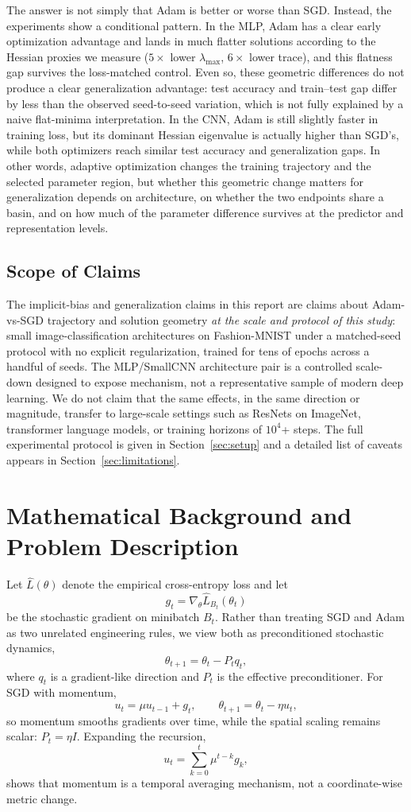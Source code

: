 \documentclass[11pt]{article}
\begin{document}
The answer is not simply that Adam is better or worse than SGD. Instead, the experiments show a conditional pattern. In the MLP, Adam has a clear early optimization advantage and lands in much flatter solutions according to the Hessian proxies we measure ($5\times$ lower $\lambda_{\max}$, $6\times$ lower trace), and this flatness gap survives the loss-matched control. Even so, these geometric differences do not produce a clear generalization advantage: test accuracy and train--test gap differ by less than the observed seed-to-seed variation, which is not fully explained by a naive flat-minima interpretation. In the CNN, Adam is still slightly faster in training loss, but its dominant Hessian eigenvalue is actually higher than SGD's, while both optimizers reach similar test accuracy and generalization gaps. In other words, adaptive optimization changes the training trajectory and the selected parameter region, but whether this geometric change matters for generalization depends on architecture, on whether the two endpoints share a basin, and on how much of the parameter difference survives at the predictor and representation levels.

\subsection{Scope of Claims}

The implicit-bias and generalization claims in this report are claims about Adam-vs-SGD trajectory and solution geometry \emph{at the scale and protocol of this study}: small image-classification architectures on Fashion-MNIST under a matched-seed protocol with no explicit regularization, trained for tens of epochs across a handful of seeds. The MLP/SmallCNN architecture pair is a controlled scale-down designed to expose mechanism, not a representative sample of modern deep learning. We do not claim that the same effects, in the same direction or magnitude, transfer to large-scale settings such as ResNets on ImageNet, transformer language models, or training horizons of $10^4$+ steps. The full experimental protocol is given in Section~\ref{sec:setup} and a detailed list of caveats appears in Section~\ref{sec:limitations}.


\section{Mathematical Background and Problem Description}

Let $\widehat L(\theta)$ denote the empirical cross-entropy loss and let
\[
g_t=\nabla_\theta \widehat L_{B_t}(\theta_t)
\]
be the stochastic gradient on minibatch $B_t$. Rather than treating SGD and Adam as two unrelated engineering rules, we view both as preconditioned stochastic dynamics,
\[
\theta_{t+1}=\theta_t-P_t q_t,
\]
where $q_t$ is a gradient-like direction and $P_t$ is the effective preconditioner.
For SGD with momentum,
\[
u_t=\mu u_{t-1}+g_t,\qquad \theta_{t+1}=\theta_t-\eta u_t,
\]
so momentum smooths gradients over time, while the spatial scaling remains scalar: $P_t=\eta I$. Expanding the recursion,
\[
u_t=\sum_{k=0}^t \mu^{t-k}g_k,
\]
shows that momentum is a temporal averaging mechanism, not a coordinate-wise metric change.
\end{document}
